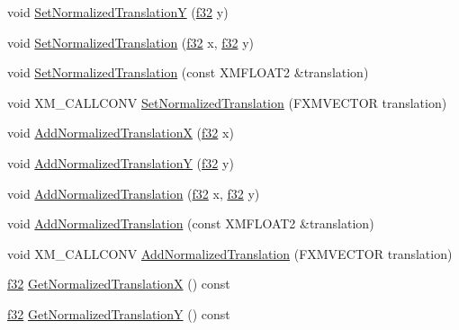 \begin{DoxyCompactItemize}
\item 
void \hyperlink{structmage_1_1_sprite_transform_a78bcdd2ddb2e67b200b3fbabf55adbb6}{Set\+Normalized\+TranslationY} (\hyperlink{namespacemage_a6a44ad388483959dc4dff9f2aef91431}{f32} y)
\item 
void \hyperlink{structmage_1_1_sprite_transform_a23174a0b3381d1c700c2fcf500e58e8f}{Set\+Normalized\+Translation} (\hyperlink{namespacemage_a6a44ad388483959dc4dff9f2aef91431}{f32} x, \hyperlink{namespacemage_a6a44ad388483959dc4dff9f2aef91431}{f32} y)
\item 
void \hyperlink{structmage_1_1_sprite_transform_a2718ece51fa0cdd839620df93ac49ff1}{Set\+Normalized\+Translation} (const X\+M\+F\+L\+O\+A\+T2 \&translation)
\item 
void X\+M\+\_\+\+C\+A\+L\+L\+C\+O\+NV \hyperlink{structmage_1_1_sprite_transform_af72bc622e7512910e5a9ceb8aeeec22d}{Set\+Normalized\+Translation} (F\+X\+M\+V\+E\+C\+T\+OR translation)
\item 
void \hyperlink{structmage_1_1_sprite_transform_abee63fe292c6575d4a4619d6b8c1889b}{Add\+Normalized\+TranslationX} (\hyperlink{namespacemage_a6a44ad388483959dc4dff9f2aef91431}{f32} x)
\item 
void \hyperlink{structmage_1_1_sprite_transform_aec164640612557f5be98b028b9d6c484}{Add\+Normalized\+TranslationY} (\hyperlink{namespacemage_a6a44ad388483959dc4dff9f2aef91431}{f32} y)
\item 
void \hyperlink{structmage_1_1_sprite_transform_a326a09356837be48c923fd9f84f77cff}{Add\+Normalized\+Translation} (\hyperlink{namespacemage_a6a44ad388483959dc4dff9f2aef91431}{f32} x, \hyperlink{namespacemage_a6a44ad388483959dc4dff9f2aef91431}{f32} y)
\item 
void \hyperlink{structmage_1_1_sprite_transform_ad5d6e1ab0012287f6ee52d19426ed6cf}{Add\+Normalized\+Translation} (const X\+M\+F\+L\+O\+A\+T2 \&translation)
\item 
void X\+M\+\_\+\+C\+A\+L\+L\+C\+O\+NV \hyperlink{structmage_1_1_sprite_transform_a167f79e773eeb4dca46915f748726113}{Add\+Normalized\+Translation} (F\+X\+M\+V\+E\+C\+T\+OR translation)
\item 
\hyperlink{namespacemage_a6a44ad388483959dc4dff9f2aef91431}{f32} \hyperlink{structmage_1_1_sprite_transform_a01833fd1b329808dd92351ef14bc08f6}{Get\+Normalized\+TranslationX} () const
\item 
\hyperlink{namespacemage_a6a44ad388483959dc4dff9f2aef91431}{f32} \hyperlink{structmage_1_1_sprite_transform_af1831c549f306f660d87301d6024ea5a}{Get\+Normalized\+TranslationY} () const

\end{DoxyCompactItemize}

